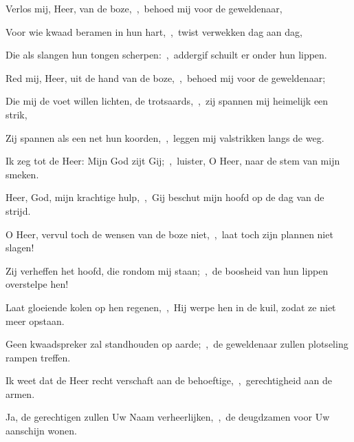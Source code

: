 \documentclass[12pt,twoside,a5paper]{article}
\begin{document}

\begin{halfparskip}
  Verlos mij, Heer, van de boze,~\sep\ behoed mij voor de geweldenaar,


  Voor wie kwaad beramen in hun hart,~\sep\ twist verwekken dag aan dag,

  Die als slangen hun tongen scherpen:~\sep\ addergif schuilt er onder hun lippen.

  Red mij, Heer, uit de hand van de boze,~\sep\ behoed mij voor de geweldenaar;

  Die mij de voet willen lichten, de trotsaards,~\sep\ zij spannen mij heimelijk een strik,

  Zij spannen als een net hun koorden,~\sep\ leggen mij valstrikken langs de weg.

  Ik zeg tot de Heer: Mijn God zijt Gij;~\sep\ luister, O Heer, naar de stem van mijn smeken.

  Heer, God, mijn krachtige hulp,~\sep\ Gij beschut mijn hoofd op de dag van de strijd.

  O Heer, vervul toch de wensen van de boze niet,~\sep\ laat toch zijn plannen niet slagen!

  Zij verheffen het hoofd, die rondom mij staan;~\sep\ de boosheid van hun lippen overstelpe hen!

  Laat gloeiende kolen op hen regenen,~\sep\ Hij werpe hen in de kuil, zodat ze niet meer opstaan.

  Geen kwaadspreker zal standhouden op aarde;~\sep\ de geweldenaar zullen plotseling rampen treffen.

  Ik weet dat de Heer recht verschaft aan de behoeftige,~\sep\ gerechtigheid aan de armen.

  Ja, de gerechtigen zullen Uw Naam verheerlijken,~\sep\ de deugdzamen voor Uw aanschijn wonen.
\end{halfparskip}

\end{document}
